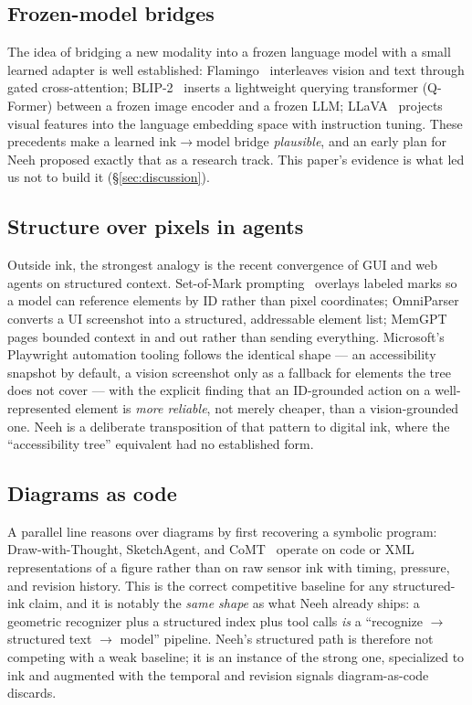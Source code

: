 \documentclass[11pt]{article}
\begin{document}
\subsection{Frozen-model bridges}
The idea of bridging a new modality into a frozen language model with a small
learned adapter is well established: Flamingo~\cite{flamingo} interleaves
vision and text through gated cross-attention; BLIP-2~\cite{blip2} inserts a
lightweight querying transformer (Q-Former) between a frozen image encoder and a
frozen LLM; LLaVA~\cite{llava} projects visual features into the language
embedding space with instruction tuning. These precedents make a learned
ink$\rightarrow$model bridge \emph{plausible}, and an early plan for Neeh
proposed exactly that as a research track. This paper's evidence is what led us
not to build it (\S\ref{sec:discussion}).

\subsection{Structure over pixels in agents}
Outside ink, the strongest analogy is the recent convergence of GUI and web
agents on structured context. Set-of-Mark prompting~\cite{setofmark} overlays
labeled marks so a model can reference elements by ID rather than pixel
coordinates; OmniParser~\cite{omniparser} converts a UI screenshot into a
structured, addressable element list; MemGPT~\cite{memgpt} pages bounded context
in and out rather than sending everything. Microsoft's Playwright automation
tooling follows the identical shape --- an accessibility snapshot by default, a
vision screenshot only as a fallback for elements the tree does not cover ---
with the explicit finding that an ID-grounded action on a well-represented
element is \emph{more reliable}, not merely cheaper, than a vision-grounded one.
Neeh is a deliberate transposition of that pattern to digital ink, where the
``accessibility tree'' equivalent had no established form.

\subsection{Diagrams as code}
A parallel line reasons over diagrams by first recovering a symbolic program:
Draw-with-Thought, SketchAgent, and CoMT~\cite{diagramcode} operate on
code or XML representations of a figure rather than on raw sensor ink with
timing, pressure, and revision history. This is the correct competitive
baseline for any structured-ink claim, and it is notably the \emph{same shape}
as what Neeh already ships: a geometric recognizer plus a structured index plus
tool calls \emph{is} a ``recognize $\rightarrow$ structured text $\rightarrow$
model'' pipeline. Neeh's structured path is therefore not competing with a weak
baseline; it is an instance of the strong one, specialized to ink and augmented
with the temporal and revision signals diagram-as-code discards.
\end{document}
